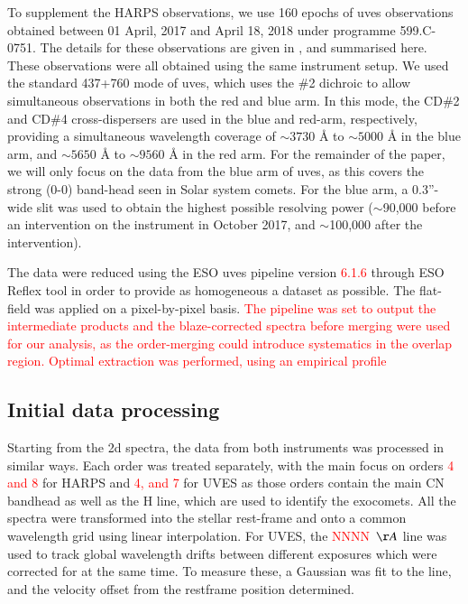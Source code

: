 \documentclass{aa}
\begin{document}
To supplement the HARPS observations, we use 160 epochs of \ac{uves} observations obtained between 01 April, 2017 and April 18, 2018 under programme 599.C-0751.
%
The details for these observations are given in \cite{vansluijs2019}, and summarised here.
%
These observations were all obtained using the same instrument setup.
%
We used the standard 437+760 mode of \ac{uves}, which uses the \#2 dichroic to allow simultaneous observations in both the red and blue arm.
%
In this mode, the CD\#2 and CD\#4 cross-dispersers are used in the blue and red-arm, respectively, providing a simultaneous wavelength coverage of $\sim 3730$ \AA{} to $\sim 5000$ \AA{} in the blue arm, and $\sim 5650$ \AA{} to $\sim 9560$ \AA{} in the red arm.
%
For the remainder of the paper, we will only focus on the data from the blue arm of \ac{uves}, as this covers the strong  (0-0) band-head seen in Solar system comets.
%
For the blue arm, a 0.3''-wide slit was used to obtain the highest possible resolving power ($\sim$90,000 before an intervention on the instrument in October 2017, and $\sim$100,000 after the intervention). 

The data were reduced using the ESO \ac{uves} pipeline version \textcolor{red}{6.1.6} through ESO Reflex tool in order to provide as homogeneous a dataset as possible. The flat-field was applied on a pixel-by-pixel basis. \textcolor{red}{The pipeline was set to output the intermediate products and the blaze-corrected spectra before merging were used for our analysis, as the order-merging could introduce systematics in the overlap region. Optimal extraction was performed, using an empirical profile}

\subsection{Initial data processing}
Starting from the 2d spectra, the data from both instruments was processed in similar ways.
%
Each order was treated separately, with the main focus on orders \textcolor{red}{4 and 8} for HARPS and \textcolor{red}{4, and 7} for UVES as those orders contain the main CN bandhead as well as the  H line, which are used to identify the exocomets.
%
All the spectra were transformed into the stellar rest-frame and onto a common wavelength grid using linear interpolation. For UVES, the  \textcolor{red}{NNNN~$\AA$} line was used to track global wavelength drifts between different exposures which were corrected for at the same time. To measure these, a Gaussian was fit to the line, and the velocity offset from the restframe position determined. 
\end{document}

